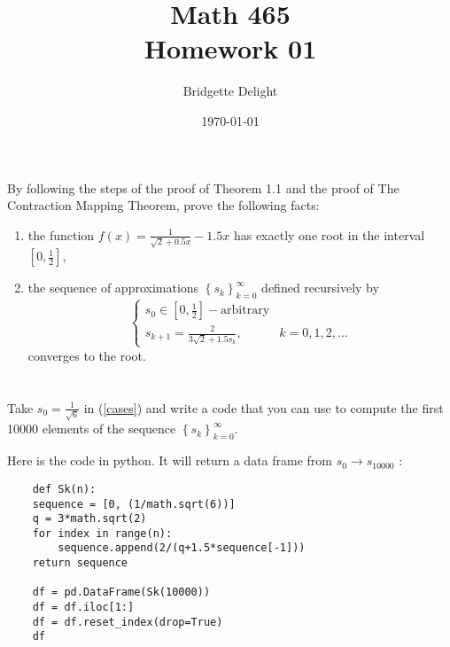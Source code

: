 \documentclass{article}
\title{{\large Math 465}\\ Homework 01}
\author{Bridgette Delight}
\date{\today}
\begin{document}
\maketitle

\section{}
By following the steps of the proof of Theorem 1.1 and the proof of The Contraction Mapping Theorem, prove the following facts:

\begin{enumerate}[label = (\alph*)]
    \item the function $f(x)= \frac{1}{\sqrt{2}+0.5x}-1.5x$ has exactly one root in the interval $\left[0, \frac{1}{2}  \right]$,
    \item the sequence of approximations $\left\{ s_k \right\}^{\infty}_{k=0}$ defined recursively by 
    \begin{equation}\label{cases}
    \begin{cases}
    s_0 \in \left[0, \frac{1}{2} \right] - \text{arbitrary}\\
    s_{k+1} = \frac{2}{3\sqrt{2}+1.5s_k}, &k=0,1,2,\dots
    \end{cases}
    \end{equation}converges to the root.
\end{enumerate}


\vspace{10mm}

\section{}
Take $s_0 = \frac{1}{\sqrt{6}}$ in (\ref{cases}) and write a code that you can use to compute the first 10000 elements of the sequence $\left\{ s_k \right\}^{\infty}_{k=0}$.
\vspace{10mm}


Here is the code in python. It will return a data frame from $s_0\to s_10000$ :
\begin{verbatim}
    def Sk(n):
    sequence = [0, (1/math.sqrt(6))]
    q = 3*math.sqrt(2)
    for index in range(n):
        sequence.append(2/(q+1.5*sequence[-1]))
    return sequence

    df = pd.DataFrame(Sk(10000))
    df = df.iloc[1:]
    df = df.reset_index(drop=True)
    df
\end{verbatim}
\end{document}

